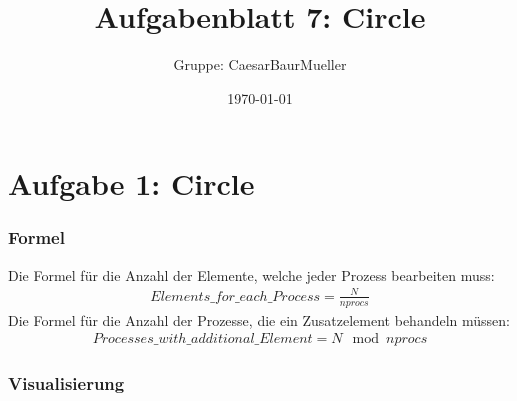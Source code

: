 \documentclass[12pt]{article}
\title{Aufgabenblatt 7: Circle}
\author{Gruppe: CaesarBaurMueller}
\date{\today}
\begin{document}
\maketitle

\begin{sloppypar}
    
\section*{Aufgabe 1: Circle}
\subsubsection*{Formel}
Die Formel für die Anzahl der Elemente, welche jeder Prozess bearbeiten muss:
\begin{equation}
    \begin{aligned}
        Elements\_for\_each\_Process = \frac{N}{nprocs}
    \end{aligned}
\end{equation}
Die Formel für die Anzahl der Prozesse, die ein Zusatzelement behandeln müssen:
\begin{equation}
    \begin{aligned}
        Processes\_with\_additional\_Element = N \mod nprocs
    \end{aligned}
\end{equation}

\subsubsection*{Visualisierung}


\end{sloppypar}
\end{document}
